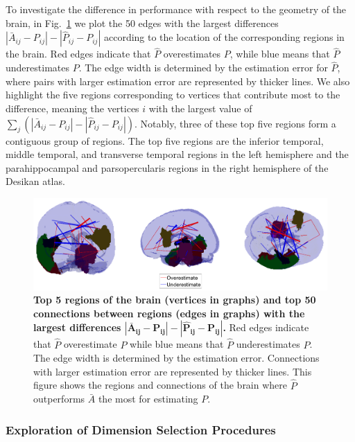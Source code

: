 \documentclass[10pt,letterpaper]{article}
\renewcommand{\hat}{\widehat}
\begin{document}
To investigate the difference in performance with respect to the geometry of the brain, in Fig.~\ref{fig:Diff_between_desikan} we plot the 50 edges with the largest differences $|\bar{A}_{ij} - P_{ij}| - |\hat{P}_{ij} - P_{ij}|$ according to the location of the corresponding regions in the brain. Red edges indicate that $\hat{P}$ overestimates $P$, while blue means that $\hat{P}$ underestimates $P$. The edge width is determined by the estimation error for $\hat{P}$, where pairs with larger estimation error are represented by thicker lines.
We also highlight the five regions corresponding to vertices that contribute most to the difference, meaning the vertices $i$ with the largest value of $\sum_j (|\bar{A}_{ij} - P_{ij}| - |\hat{P}_{ij} - P_{ij}|)$.
Notably, three of these top five regions form a contiguous group of regions.
The top five regions are the inferior temporal, middle temporal, and transverse temporal regions in the left hemisphere and the parahippocampal and parsopercularis regions in the right hemisphere of the Desikan atlas.

\begin{figure}[!htbp]
\centering
\includegraphics[width=1\textwidth]{Diff_between_desikan.png}
\caption{{\bf Top 5 regions of the brain (vertices in graphs) and top 50 connections between regions (edges in graphs) with the largest differences $\bm{|\bar{A}_{ij} - P_{ij}| - |\hat{P}_{ij} - P_{ij}|}$.}
Red edges indicate that $\hat{P}$ overestimate $P$ while blue means that $\hat{P}$ underestimates $P$. The edge width is determined by the estimation error. Connections with larger estimation error are represented by thicker lines. This figure shows the regions and connections of the brain where $\hat{P}$ outperforms $\bar{A}$ the most for estimating $P$.}
\label{fig:Diff_between_desikan}
\end{figure}

\subsubsection{Exploration of Dimension Selection Procedures}
\end{document}
